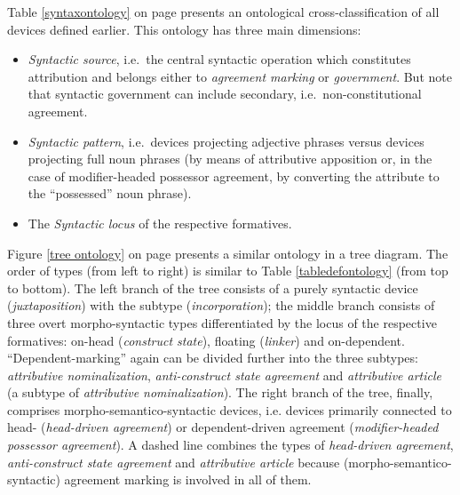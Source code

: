 Table \ref{syntaxontology} on page \pageref{syntaxontology} presents an ontological cross-classification of all devices defined earlier. This ontology has three main dimensions: 
\begin{itemize}
\item{{\it Syntactic source}}, i.e.~the central syntactic operation which constitutes attribution and belongs either to {\it agreement marking} or {\it government}. But note that syntactic government can include secondary, i.e.~non-constitutional agreement.
\item{{\it Syntactic pattern}}, i.e.~devices projecting adjective phrases versus devices projecting full noun phrases (by means of attributive apposition or, in the case of modifier-headed possessor agreement, by converting the attribute to the “possessed” noun phrase).
\item{The {\it Syntactic locus}} of the respective formatives.
\end{itemize}
Figure \ref{tree ontology} on page \pageref{tree ontology} presents a similar ontology in a tree diagram. The order of types (from left to right) is similar to Table \ref{tabledefontology} (from top to bottom). The left branch of the tree consists of a purely syntactic device ({\it juxtaposition}) with the subtype ({\it incorporation}); the middle branch consists of three overt morpho-syntactic types differentiated by the locus of the respective formatives: on-head ({\it construct state}), floating ({\it linker}) and on-dependent. “Dependent-marking” again can be divided further into the three subtypes: {\it attributive nominalization}, {\it anti-construct state agreement} and {\it attributive article} (a subtype of {\it attributive nominalization}). The right branch of the tree, finally, comprises morpho-semantico-syntactic devices, i.e. devices primarily connected to head- ({\it head-driven agreement}) or dependent-driven agreement ({\it modifier-headed possessor agreement}). A dashed line combines the types of {\it head-driven agreement}, {\it anti-construct state agreement} and {\it attributive article} because (morpho-semantico-syntactic) agreement marking is involved in all of them.

